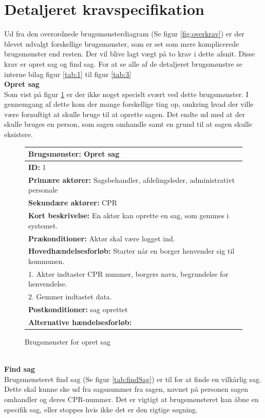 \section{Detaljeret kravspecifikation}
Ud fra den overordnede brugsmønsterdiagram (Se figur \ref{fig:overkrav}) er der blevet udvalgt forskellige brugsmønster, som er set som mere komplicerede brugsmønster end resten. Der vil blive lagt vægt på to krav i dette afsnit. Disse krav er opret sag og find sag. For at se alle af de detaljeret brugsmønstre se interne bilag figur \ref{tab:1} til figur \ref{tab:3} \\
\textbf{Opret sag} \\
Som vist på figur \ref{tab:opretSag} er der ikke noget specielt svært ved dette brugsmønster. I gennemgang af dette kom der mange forskellige ting op, omkring hvad der ville være fornuftigt at skulle bruge til at oprette sagen. Det endte ud med at der skulle bruges en person, som sagen omhandle samt en grund til at sagen skulle eksistere.
\begin{figure}[hbt!]
\begin{longtable}{|p{18cm}|}
\hline
\textbf{Brugsmønster: }Opret sag \\
\hline
\textbf{ID: }1 \\
\hline
\textbf{Primære aktører: }Sagsbehandler, afdelingsleder, administrativt personale\\
\hline
\textbf{Sekundære aktører: }CPR\\
\hline
\textbf{Kort beskrivelse: }En aktør kan oprette en sag, som gemmes i systemet. \\
\hline
\textbf{Prækonditioner: }Aktør skal være logget ind.\\
\hline
\textbf{Hovedhændelsesforløb: }\newline 
Starter når en borger henvender sig til kommunen. \\
1. Aktør indtaster CPR nummer, borgers navn, begrundelse for henvendelse. \\
2. Gemmer indtastet data.	
\\
\hline
\textbf{Postkonditioner: }sag oprettet\\
\hline
\textbf{Alternative hændelsesforløb: }\\
\hline
\end{longtable}
\caption{Brugsmønster for opret sag}
\label{tab:opretSag}
\end{figure}\\
\textbf{Find sag}\\
Brugsmønsteret find sag (Se figur \ref{tab:findSag}) er til for at finde en vilkårlig sag. Dette skal kunne ske ud fra sagsnummer fra sagen, navnet på personen sagen omhandler og deres CPR-nummer. Det er vigtigt at brugsmønsteret kan åbne en specifik sag, eller stoppes hvis ikke det er den rigtige søgning. 
